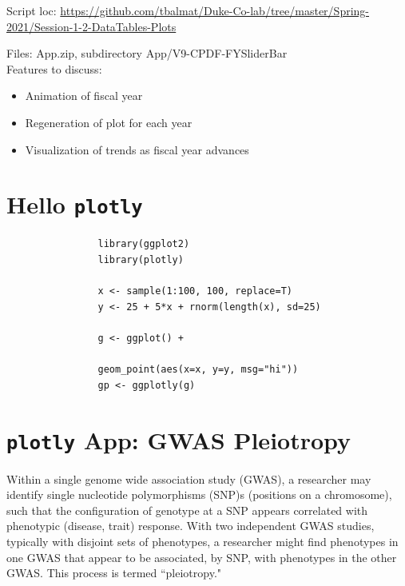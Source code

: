 \documentclass[10pt, letterpaper]{article}
\begin{document}
\begin{spacing}{1.0}
Script loc:
\small
\url{https://github.com/tbalmat/Duke-Co-lab/tree/master/Spring-2021/Session-1-2-DataTables-Plots}\\
\normalsize

Files: App.zip, subdirectory App/V9-CPDF-FYSliderBar\\

Features to discuss:

\begin{itemize}[noitemsep]
    \item Animation of fiscal year
    \item Regeneration of plot for each year
    \item Visualization of trends as fiscal year advances
\end{itemize}


\section{Hello \texttt{plotly}}\label{sec:hello}

\small
\begin{verbatim}
                library(ggplot2)
                library(plotly)
                
                x <- sample(1:100, 100, replace=T)
                y <- 25 + 5*x + rnorm(length(x), sd=25)
                
                g <- ggplot() +
                
                geom_point(aes(x=x, y=y, msg="hi"))
                gp <- ggplotly(g)
\end{verbatim}
\normalsize


\section{\texttt{plotly} App:  GWAS Pleiotropy}\label{sec:pleiotropy}

Within a single genome wide association study (GWAS), a researcher may identify single nucleotide polymorphisms (SNP)s (positions on a chromosome), such that the configuration of genotype at a SNP appears correlated with phenotypic (disease, trait) response.  With two independent GWAS studies, typically with disjoint sets of phenotypes, a researcher might find phenotypes in one GWAS that appear to be associated, by SNP, with phenotypes in the other GWAS.  This process is termed ``pleiotropy."\\


\end{spacing}
\end{document}
